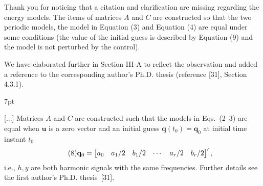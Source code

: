 \documentclass[10pt]{letter}
\newenvironment{formal}{%
  \def\FrameCommand{%
    \hspace{1pt}%
    {\color{red}\vrule width 2pt}%
    {\color{formalshade}\vrule width 4pt}%
    \colorbox{formalshade}%
  }%
  \MakeFramed{\advance\hsize-\width\FrameRestore}%
  \noindent\hspace{-4.55pt}%
  \begin{adjustwidth}{}{7pt}%
  \vspace{2pt}\vspace{2pt}%
}
{%
  \vspace{2pt}\end{adjustwidth}\endMakeFramed%
}
\begin{document}
{\color{blue} 

{\hspace*{-4.5em}{[R1:12]}\vspace*{-1.9em}}

Thank you for noticing that a citation and clarification are missing regarding the energy models. The items of matrices $A$ and $C$ are constructed so that the two periodic models, the model in Equation ({\color{red}3}) and Equation ({\color{red}4}) are equal under some conditions (the value of the initial guess is described by Equation ({\color{red}9}) and the model is not perturbed by the control).

We have elaborated further in Section III-A to reflect the observation and added a reference to the corresponding author's Ph.D. thesis (reference [{\color{green}31}], Section 4.3.1).

\begin{formal}
  {\color{black}
  [...] {\color{blue}Matrices $A$ and $C$ are constructed such that t}he %
  models in Eqs.~({\color{red}2}--{\color{red}3}) {\color{black}are equal when $\mathbf{u}$ is a {\color{black}zero vector %
  and an initial guess $\mathbf{q}(t_0)=\mathbf{q}_0$ at initial time instant $t_0$}}
    {\color{blue}\begin{equation}\tag{8}
    {\color{black}\mathbf{q}_0=\begin{bmatrix}a_0 & a_1/2 & b_1/2 & \cdots & a_r/2 & b_r/2\end{bmatrix}',}
    \end{equation}}
  \color{black}i.e., $h,y$ are both harmonic signals with the same frequencies. {\color{blue}Further details see the first author's Ph.D. thesis~[{\color{green}31}]}.
  }
  \vspace*{1ex}
\end{formal}
}
\end{document}
